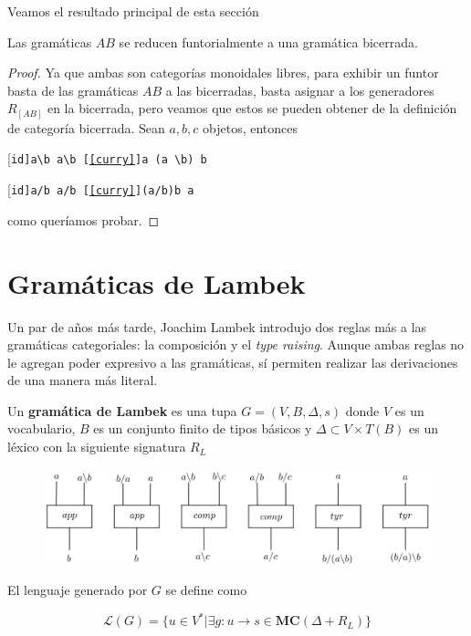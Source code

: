 \documentclass[../main.tex]{subfiles}
\begin{document}
	Veamos el resultado principal de esta sección
	
	\begin{prop}
		Las gramáticas $AB$ se reducen funtorialmente a una gramática bicerrada.
	\end{prop}
	\begin{proof}
		Ya que ambas son categorías monoidales libres, para exhibir un funtor basta de las gramáticas $AB$ a las bicerradas, basta asignar a los generadores $R_[AB]$ en la bicerrada, pero veamos que estos se pueden obtener de la definición de categoría bicerrada. Sean $a,b,c$ objetos, entonces
		\begin{multicols}{2}
			\begin{prooftree}
				[\tt{id}]{a\backslash b \to a\backslash b}
				[\ref{curry}]{a \otimes (a \backslash b) \to b}
			\end{prooftree}
            
			\begin{prooftree}
				\hypo{a/b}
				[\tt{id}]{a/b \to a/b}
				[\ref{curry}]{(a/b)\otimes b \to a}
			\end{prooftree}
		\end{multicols}
		como queríamos probar. 
	\end{proof}
	  
	\section{Gramáticas de Lambek} 
	
	Un par de años más tarde, Joachim Lambek introdujo dos reglas más a las gramáticas categoriales: la composición y el \textit{type raising}. Aunque ambas reglas no le agregan poder expresivo a las gramáticas, sí permiten realizar las derivaciones de una manera más literal. 
	
	\begin{dfn}
		Un \textbf{gramática de Lambek} es una tupa $G=(V,B, \Delta, s)$ donde $V$ es un vocabulario, $B$ es un conjunto finito de tipos básicos y $\Delta \subset V \times T(B)$ es un léxico con la siguiente signatura $R_L$
		
		\begin{figure}[H]
			\includegraphics[scale=18]{diagrama/lambek.png}
			\centering
		\end{figure}
		El lenguaje generado por $G$ se define como
		
		$$\mathcal{L}(G)= \{ u \in V^*|\exists g:u \to s \in \textbf{MC}(\Delta + R_{L}) \}$$
		
	\end{dfn}
	
\end{document}
